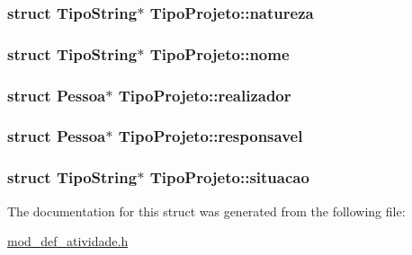 \hypertarget{structTipoProjeto_a2a7bffb56a5124f36a049e6daa525e79}{
\subsubsection[{natureza}]{\setlength{\rightskip}{0pt plus 5cm}struct {\bf Tipo\+String}$\ast$ Tipo\+Projeto\+::natureza}}\label{structTipoProjeto_a2a7bffb56a5124f36a049e6daa525e79}
\hypertarget{structTipoProjeto_a84112a84029e69cad4d8d97b9c61f45b}{
\subsubsection[{nome}]{\setlength{\rightskip}{0pt plus 5cm}struct {\bf Tipo\+String}$\ast$ Tipo\+Projeto\+::nome}}\label{structTipoProjeto_a84112a84029e69cad4d8d97b9c61f45b}
\hypertarget{structTipoProjeto_a2eae4616af07378aa2f9cc7045bfae0f}{
\subsubsection[{realizador}]{\setlength{\rightskip}{0pt plus 5cm}struct Pessoa$\ast$ Tipo\+Projeto\+::realizador}}\label{structTipoProjeto_a2eae4616af07378aa2f9cc7045bfae0f}
\hypertarget{structTipoProjeto_ad8411f55123381a349fa29175ad0037f}{
\subsubsection[{responsavel}]{\setlength{\rightskip}{0pt plus 5cm}struct Pessoa$\ast$ Tipo\+Projeto\+::responsavel}}\label{structTipoProjeto_ad8411f55123381a349fa29175ad0037f}
\hypertarget{structTipoProjeto_af7841313daf1014d1be23fc0cb115e5a}{
\subsubsection[{situacao}]{\setlength{\rightskip}{0pt plus 5cm}struct {\bf Tipo\+String}$\ast$ Tipo\+Projeto\+::situacao}}\label{structTipoProjeto_af7841313daf1014d1be23fc0cb115e5a}


The documentation for this struct was generated from the following file\+:\begin{DoxyCompactItemize}
\item 
\hyperlink{mod__def__atividade_8h}{mod\+\_\+def\+\_\+atividade.\+h}\end{DoxyCompactItemize}
